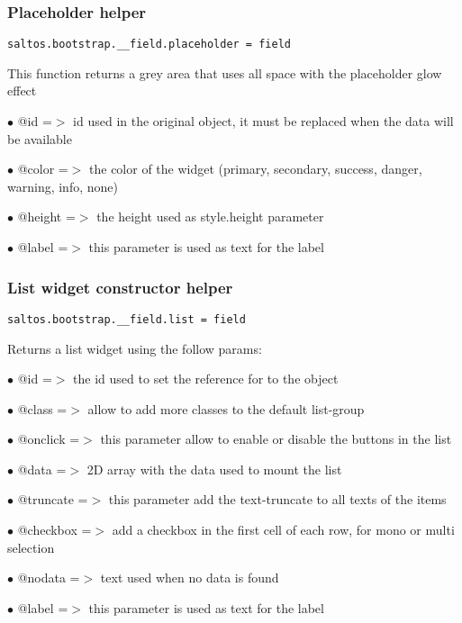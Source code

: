 \documentclass[a4paper]{article}
\begin{document}
\hypertarget{toc643}{}
\subsubsection{Placeholder helper}

\begin{lstlisting}
saltos.bootstrap.__field.placeholder = field
\end{lstlisting}

This function returns a grey area that uses all space with the placeholder glow effect

\begin{compactitem}
\item[\color{myblue}$\bullet$] @id     =$>$ id used in the original object, it must be replaced when the data will be available
\item[\color{myblue}$\bullet$] @color  =$>$ the color of the widget (primary, secondary, success, danger, warning, info, none)
\item[\color{myblue}$\bullet$] @height =$>$ the height used as style.height parameter
\item[\color{myblue}$\bullet$] @label  =$>$ this parameter is used as text for the label
\end{compactitem}

\hypertarget{toc644}{}
\subsubsection{List widget constructor helper}

\begin{lstlisting}
saltos.bootstrap.__field.list = field
\end{lstlisting}

Returns a list widget using the follow params:

\begin{compactitem}
\item[\color{myblue}$\bullet$] @id       =$>$ the id used to set the reference for to the object
\item[\color{myblue}$\bullet$] @class    =$>$ allow to add more classes to the default list-group
\item[\color{myblue}$\bullet$] @onclick  =$>$ this parameter allow to enable or disable the buttons in the list
\item[\color{myblue}$\bullet$] @data     =$>$ 2D array with the data used to mount the list
\item[\color{myblue}$\bullet$] @truncate =$>$ this parameter add the text-truncate to all texts of the items
\item[\color{myblue}$\bullet$] @checkbox =$>$ add a checkbox in the first cell of each row, for mono or multi selection
\item[\color{myblue}$\bullet$] @nodata   =$>$ text used when no data is found
\item[\color{myblue}$\bullet$] @label    =$>$ this parameter is used as text for the label
\end{compactitem}
\end{document}
